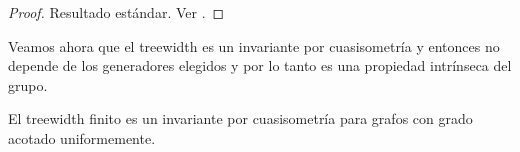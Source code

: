 \documentclass[tesis.tex]{subfiles}
\begin{document}
\begin{proof}
	Resultado estándar. Ver \cite{bridson2013metric}.
\end{proof}


%	

Veamos ahora que el treewidth es un invariante por cuasisometría y entonces no depende de los generadores elegidos y por lo tanto es una propiedad intrínseca del grupo. 

\begin{prop} \label{treewidth-inv}
	El treewidth finito es un invariante por cuasisometría para grafos con grado acotado uniformemente.
\end{prop}
\end{document}
